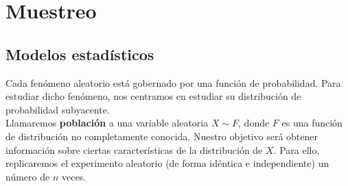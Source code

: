 \chapter{Muestreo}
\section{Modelos estadísticos}
Cada fenómeno aleatorio está gobernado por una función de probabilidad. Para estudiar dicho fenómeno, nos centramos en estudiar su distribución de probabilidad subyacente. \\

Llamaremos \textbf{población} a una variable aleatoria $\displaystyle X \sim F $, donde $\displaystyle F $ es una función de distribución no completamente conocida. Nuestro objetivo será obtener información sobre ciertas características de la distribución de $\displaystyle X $. Para ello, replicaremos el experimento aleatorio (de forma idéntica e independiente) un número de $\displaystyle n $ veces. \\


